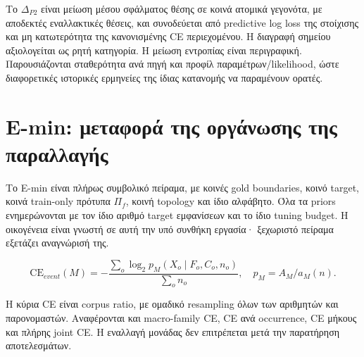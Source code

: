 \documentclass[
  10pt,
  a4paper,
]{report}
\begin{document}
Το \(\Delta_{P2}\) είναι μείωση μέσου σφάλματος θέσης σε κοινά ατομικά
γεγονότα, με αποδεκτές εναλλακτικές θέσεις, και συνοδεύεται από
predictive log loss της στοίχισης και μη κατωτερότητα της κανονισμένης
CE περιεχομένου. Η διαγραφή σημείου αξιολογείται ως ρητή κατηγορία. Η
μείωση εντροπίας είναι περιγραφική. Παρουσιάζονται σταθερότητα ανά πηγή
και προφίλ παραμέτρων/likelihood, ώστε διαφορετικές ιστορικές ερμηνείες
της ίδιας κατανομής να παραμένουν ορατές.

\section{E-min: μεταφορά της οργάνωσης της
παραλλαγής}\label{e-min-ux3bcux3b5ux3c4ux3b1ux3c6ux3bfux3c1ux3ac-ux3c4ux3b7ux3c2-ux3bfux3c1ux3b3ux3acux3bdux3c9ux3c3ux3b7ux3c2-ux3c4ux3b7ux3c2-ux3c0ux3b1ux3c1ux3b1ux3bbux3bbux3b1ux3b3ux3aeux3c2}

Το E-min είναι πλήρως συμβολικό πείραμα, με κοινές gold boundaries,
κοινό target, κοινά train-only πρότυπα \(\Pi_f\), κοινή topology και
ίδιο αλφάβητο. Όλα τα priors ενημερώνονται με τον ίδιο αριθμό target
εμφανίσεων και το ίδιο tuning budget. Η οικογένεια είναι γνωστή σε αυτή
την υπό συνθήκη εργασία· ξεχωριστό πείραμα εξετάζει αναγνώρισή της.

\[
\mathrm{CE}_{event}(M)=-\frac{\sum_o\log_2p_M(X_o\mid F_o,C_o,n_o)}{\sum_o n_o},\quad
p_M=A_M/a_M(n).
\]

Η κύρια CE είναι corpus ratio, με ομαδικό resampling όλων των αριθμητών
και παρονομαστών. Αναφέρονται και macro-family CE, CE ανά occurrence, CE
μήκους και πλήρης joint CE. Η εναλλαγή μονάδας δεν επιτρέπεται μετά την
παρατήρηση αποτελεσμάτων.
\end{document}
